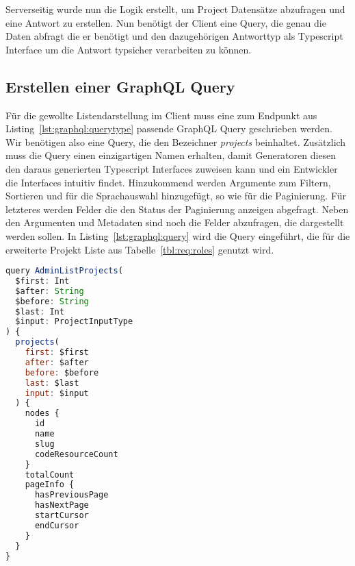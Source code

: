 Serverseitig wurde nun die Logik erstellt, um Project Datensätze abzufragen und eine Antwort zu erstellen.
Nun benötigt der Client eine Query, die genau die Daten abfragt die er benötigt und den dazugehörigen Antworttyp als Typescript Interface um die Antwort typsicher verarbeiten zu können.

\subsection{Erstellen einer GraphQL Query}
\label{impl:graphql:query}
Für die gewollte Listendarstellung im Client muss eine zum Endpunkt aus Listing~\ref{lst:graphql:querytype} passende GraphQL Query geschrieben werden. Wir benötigen also eine Query, die den Bezeichner \emph{projects} beinhaltet. Zusätzlich muss die Query einen einzigartigen Namen erhalten, damit Generatoren diesen den daraus generierten Typescript Interfaces zuweisen kann und ein Entwickler die Interfaces intuitiv findet. Hinzukommend werden Argumente zum Filtern, Sortieren und für die Sprachauswahl hinzugefügt, so wie für die Paginierung. Für letzteres werden Felder die den Status der Paginierung anzeigen abgefragt. Neben den Argumenten und Metadaten 
sind noch die Felder abzufragen, die dargestellt werden sollen.
In Listing~\ref{lst:graphql:query} wird die Query eingeführt, die für die erweiterte Projekt Liste aus Tabelle~\ref{tbl:req:roles} genutzt wird.

\begin{lstlisting}[language=JavaScript,float=h!,caption={GraphQL Query für eine paginierte Listendarstellung mit Möglichkeit des Filterns, der Sortierung und der Sprachauswahl}, label={lst:graphql:query}]
query AdminListProjects(
  $first: Int
  $after: String
  $before: String
  $last: Int
  $input: ProjectInputType
) {
  projects(
    first: $first
    after: $after
    before: $before
    last: $last
    input: $input
  ) {
    nodes {
      id
      name
      slug
      codeResourceCount
    }
	totalCount
	pageInfo {
	  hasPreviousPage
	  hasNextPage
	  startCursor
	  endCursor
	}
  }
}
\end{lstlisting}

